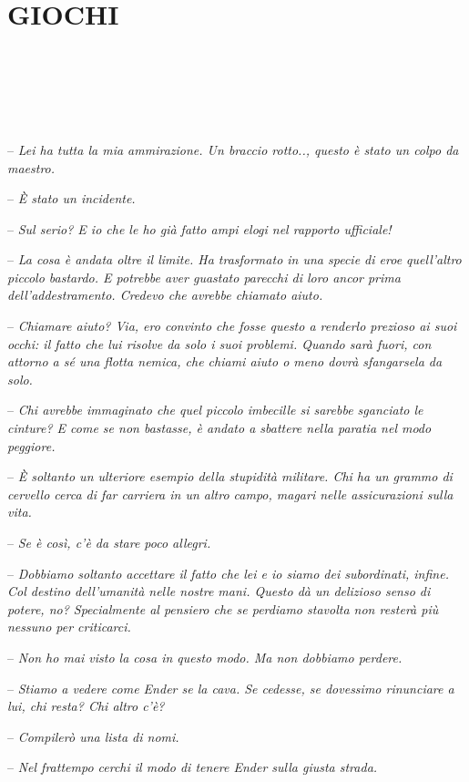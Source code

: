 \chapter{GIOCHI}

{~}

{~}

{~}

{-- \emph{Lei ha tutta la mia ammirazione. Un braccio rotto.., questo è
		stato un colpo da maestro.}}

{-- \emph{È stato un incidente.}}

{-- \emph{Sul serio? E io che le ho già fatto ampi elogi nel rapporto
		ufficiale!}}

{-- \emph{La cosa è andata oltre il limite. Ha trasformato in una specie
		di eroe quell'altro piccolo bastardo. E potrebbe aver guastato parecchi
		di loro ancor prima dell'addestramento. Credevo che avrebbe chiamato
		aiuto.}}

{-- \emph{Chiamare aiuto? Via, ero convinto che fosse questo a renderlo
		prezioso ai suoi occhi: il fatto che lui risolve da solo i suoi
		problemi. Quando sarà fuori, con attorno a sé una flotta nemica, che
		chiami aiuto o meno dovrà sfangarsela da solo.}}

{-- \emph{Chi avrebbe immaginato che quel piccolo imbecille si sarebbe
		sganciato le cinture? E come se non bastasse, è andato a sbattere nella
		paratia nel modo peggiore.}}

{-- \emph{È soltanto un ulteriore esempio della stupidità militare. Chi
		ha un grammo di cervello cerca di far carriera in un altro campo, magari
		nelle assicurazioni sulla vita.}}

{-- \emph{Se è così, c'è da stare poco allegri.}}

{-- \emph{Dobbiamo soltanto accettare il fatto che lei e io siamo dei
		subordinati, infine. Col destino dell'umanità nelle nostre mani. Questo
		dà un delizioso senso di potere, no? Specialmente al pensiero che se
		perdiamo stavolta non resterà più nessuno per criticarci.}}

{-- \emph{Non ho mai visto la cosa in questo modo. Ma non dobbiamo
		perdere.}}

{-- \emph{Stiamo a vedere come Ender se la cava. Se cedesse, se
		dovessimo rinunciare a lui, chi resta? Chi altro c'è?}}

{-- \emph{Compilerò una lista di nomi.}}

{-- \emph{Nel frattempo cerchi il modo di tenere Ender sulla giusta
		strada.}}

